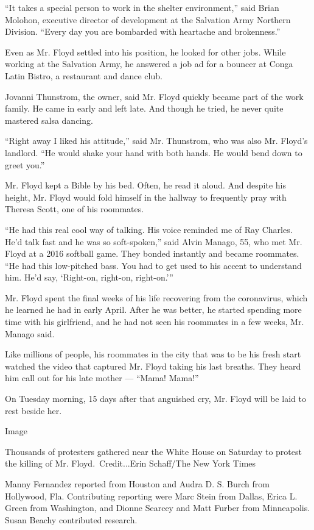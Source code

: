 ``It takes a special person to work in the shelter environment,'' said
Brian Molohon, executive director of development at the Salvation Army
Northern Division. ``Every day you are bombarded with heartache and
brokenness.''

Even as Mr. Floyd settled into his position, he looked for other jobs.
While working at the Salvation Army, he answered a job ad for a bouncer
at Conga Latin Bistro, a restaurant and dance club.

Jovanni Thunstrom, the owner, said Mr. Floyd quickly became part of the
work family. He came in early and left late. And though he tried, he
never quite mastered salsa dancing.

``Right away I liked his attitude,'' said Mr. Thunstrom, who was also
Mr. Floyd's landlord. ``He would shake your hand with both hands. He
would bend down to greet you.''

Mr. Floyd kept a Bible by his bed. Often, he read it aloud. And despite
his height, Mr. Floyd would fold himself in the hallway to frequently
pray with Theresa Scott, one of his roommates.

``He had this real cool way of talking. His voice reminded me of Ray
Charles. He'd talk fast and he was so soft-spoken,'' said Alvin Manago,
55, who met Mr. Floyd at a 2016 softball game. They bonded instantly and
became roommates. ``He had this low-pitched bass. You had to get used to
his accent to understand him. He'd say, `Right-on, right-on,
right-on.'''

Mr. Floyd spent the final weeks of his life recovering from the
coronavirus, which he learned he had in early April. After he was
better, he started spending more time with his girlfriend, and he had
not seen his roommates in a few weeks, Mr. Manago said.

Like millions of people, his roommates in the city that was to be his
fresh start watched the video that captured Mr. Floyd taking his last
breaths. They heard him call out for his late mother --- ``Mama! Mama!''

On Tuesday morning, 15 days after that anguished cry, Mr. Floyd will be
laid to rest beside her.

Image

Thousands of protesters gathered near the White House on Saturday to
protest the killing of Mr. Floyd.~Credit...Erin Schaff/The New York
Times

Manny Fernandez reported from Houston and Audra D. S. Burch from
Hollywood, Fla. Contributing reporting were Marc Stein from Dallas,
Erica L. Green from Washington, and Dionne Searcey and Matt Furber from
Minneapolis. Susan Beachy contributed research.

